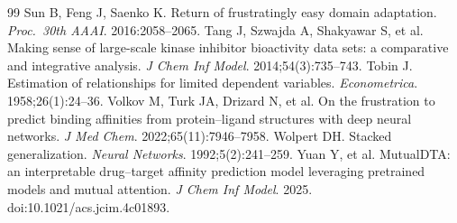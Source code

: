 \documentclass[10pt,letterpaper]{article}
\begin{document}
\begin{thebibliography}{99}
 Sun B, Feng J, Saenko K. Return of frustratingly easy domain adaptation. \emph{Proc.\ 30th AAAI}. 2016:2058--2065.
 Tang J, Szwajda A, Shakyawar S, et al. Making sense of large-scale kinase inhibitor bioactivity data sets: a comparative and integrative analysis. \emph{J Chem Inf Model}. 2014;54(3):735--743.
 Tobin J. Estimation of relationships for limited dependent variables. \emph{Econometrica}. 1958;26(1):24--36.
 Volkov M, Turk JA, Drizard N, et al. On the frustration to predict binding affinities from protein--ligand structures with deep neural networks. \emph{J Med Chem}. 2022;65(11):7946--7958.
 Wolpert DH. Stacked generalization. \emph{Neural Networks}. 1992;5(2):241--259.
 Yuan Y, et al. MutualDTA: an interpretable drug--target affinity prediction model leveraging pretrained models and mutual attention. \emph{J Chem Inf Model}. 2025. doi:10.1021/acs.jcim.4c01893.
\end{thebibliography}
\end{document}
